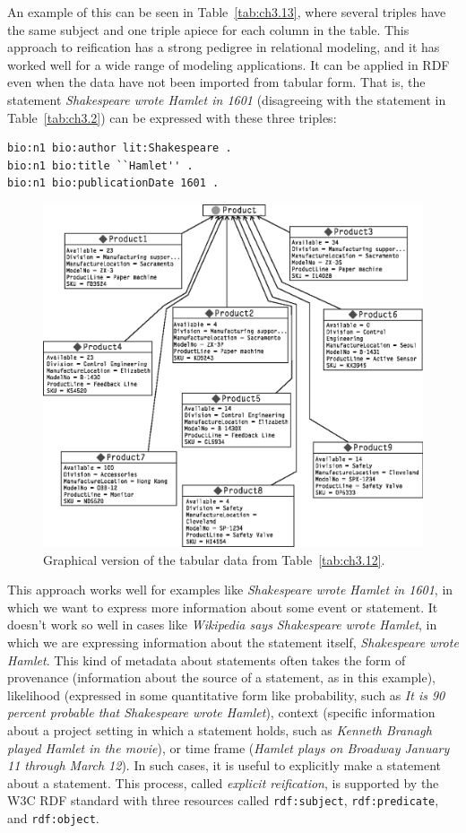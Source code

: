 An example of this can be seen in Table~\ref{tab:ch3.13}, where several triples have
the same subject and one triple apiece for each column in the table.
This approach to reification has a strong pedigree in relational
modeling, and it has worked well for a wide range of modeling
applications. It can be applied in RDF even when the data have not been
imported from tabular form. That is, the statement \emph{Shakespeare
wrote Hamlet in 1601} (disagreeing with the statement in Table~\ref{tab:ch3.2}) can
be expressed with these three triples:

\begin{lstlisting}
bio:n1 bio:author lit:Shakespeare . 
bio:n1 bio:title ``Hamlet'' .
bio:n1 bio:publicationDate 1601 .
\end{lstlisting}

\begin{figure}
    \centering
    \includegraphics[width=5.0in]{media/ch3/f03-07-9780123859655.eps}
    \caption{Graphical version of the tabular data from Table~\ref{tab:ch3.12}.}
    \label{fig:ch3.7}
\end{figure}


This approach works well for examples like \emph{Shakespeare wrote
Hamlet in 1601}, in which we want to express more information about some
event or statement. It doesn't work so well in cases like
\emph{Wikipedia says Shakespeare wrote Hamlet}, in which we are
expressing information about the statement itself, \emph{Shakespeare
wrote Hamlet}. This kind of metadata about statements often takes the
form of provenance (information about the source of a statement, as in
this example), likelihood (expressed in some quantitative form like
probability, such as \emph{It is 90 percent probable that Shakespeare
wrote Hamlet}), context (specific information about a project setting in
which a statement holds, such as \emph{Kenneth Branagh played Hamlet in
the movie}), or time frame (\emph{Hamlet plays on Broadway January 11
through March 12}). In such cases, it is useful to explicitly make a
statement about a statement. This process, called \emph{explicit reification},
is supported by the W3C RDF standard with three resources called
\texttt{rdf:subject}, \texttt{rdf:predicate}, and \texttt{rdf:object}.

